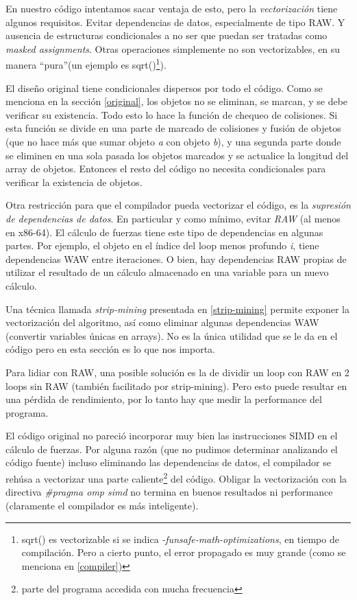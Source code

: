 \documentclass{article}
\begin{document}
En nuestro código intentamos sacar ventaja de esto, pero la \textit{vectorización} tiene algunos requisitos.
Evitar dependencias de datos, especialmente de tipo RAW. Y ausencia de estructuras condicionales a no ser
que puedan ser tratadas como \textit{masked assignments}. Otras operaciones simplemente no son vectorizables,
en su manera ``pura''(un ejemplo es sqrt()\footnote{sqrt() es vectorizable si se indica \textit{-funsafe-math-optimizations},
en tiempo de compilación. Pero a cierto punto, el error propagado es muy grande (como se menciona en \ref{compiler})}).


El diseño original tiene condicionales dispersos por todo el código. Como se menciona en
la sección \ref{original}, los objetos no se eliminan, se marcan, y se debe verificar su existencia.
Todo esto lo hace la función de chequeo de colisiones. Si esta función se divide en una parte de marcado
de colisiones y fusión de objetos (que no hace más que sumar objeto \textit{a} con objeto \textit{b}), y
una segunda parte donde se eliminen en una sola pasada los objetos marcados y se actualice la longitud
del array de objetos. Entonces el resto del código no necesita condicionales para verificar la existencia de objetos.


Otra restricción para que el compilador pueda vectorizar el código, es la \textit{supresión de dependencias de datos}.
En particular y como mínimo, evitar \textit{RAW} (al menos en x86-64). El cálculo de fuerzas tiene este tipo de dependencias en algunas
partes. Por ejemplo, el objeto en el índice del loop menos profundo \textit{i}, tiene dependencias WAW entre iteraciones.
O bien, hay dependencias RAW propias de utilizar el resultado de un cálculo almacenado en una variable para un nuevo cálculo.


Una técnica llamada \textit{strip-mining} presentada en \ref{strip-mining} permite exponer la vectorización
del algoritmo, así como eliminar algunas dependencias WAW (convertir variables únicas en arrays). No es
la única utilidad que se le da en el código pero en esta sección es lo que nos importa.


Para lidiar con RAW, una posible solución es la de dividir un loop con RAW en 2 loops sin RAW (también
facilitado por strip-mining). Pero esto puede resultar en una pérdida de rendimiento, por lo tanto
hay que medir la performance del programa.


El código original no pareció incorporar muy bien las instrucciones SIMD en el cálculo de fuerzas.
Por alguna razón (que no pudimos determinar analizando el código fuente)
incluso eliminando las dependencias de datos, el compilador se rehúsa a vectorizar
una parte caliente\footnote{parte del programa accedida con mucha frecuencia} del código. Obligar la vectorización
con la directiva \textit{\#pragma omp simd} no termina en buenos resultados ni performance (claramente el compilador
es más inteligente).
\end{document}
